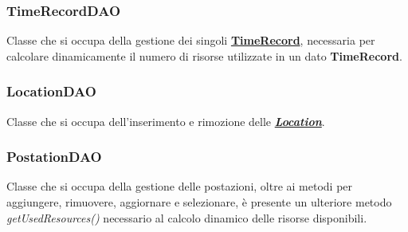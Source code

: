 \documentclass{article}
\begin{document}
\subsubsection{TimeRecordDAO}\label{subsubsec:timerecordDAO}
Classe che si occupa della gestione dei singoli \hyperref[subsubsec:timerecord]{\textbf{TimeRecord}}, necessaria per calcolare dinamicamente il numero di risorse utilizzate in un dato \textbf{TimeRecord}.
\subsubsection{LocationDAO}\label{subsubsec:locationDAO}
Classe che si occupa dell'inserimento e rimozione delle \hyperref[subsubsec:Location]{\textit{\textbf{Location}}}.
\subsubsection{PostationDAO}\label{subsubsec:postationDAO}
Classe che si occupa della gestione delle postazioni, oltre ai metodi per aggiungere, rimuovere, aggiornare e selezionare, è presente un ulteriore metodo \textit{getUsedResources()} necessario al calcolo dinamico delle risorse disponibili.
\end{document}
